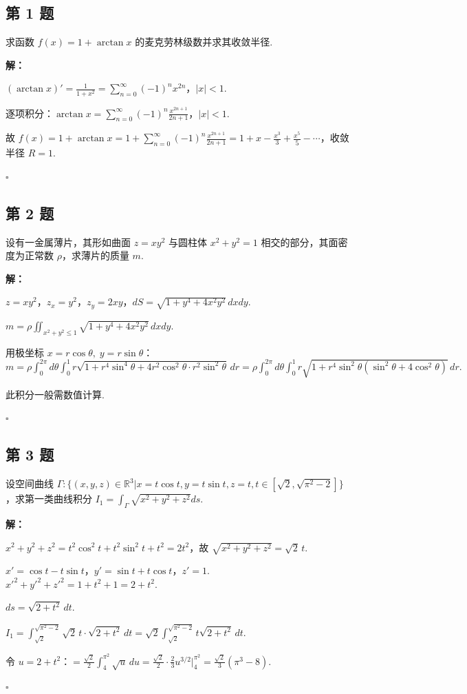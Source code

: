 \documentclass[12pt,a4paper]{article}
\newenvironment{sol}[1][解]{%
  \par\medskip\noindent\textbf{#1：}\itshape\par\noindent\ignorespaces
}{%
  \par\hfill$\square$\par\medskip
}
\begin{document}
\subsection*{第 1 题}
求函数 $f(x)=1+\arctan x$ 的麦克劳林级数并求其收敛半径.

\begin{sol}$(\arctan
  x)'=\frac{1}{1+x^2}=\sum_{n=0}^{\infty}(-1)^nx^{2n}$，$|x|<1$.

  逐项积分：$\arctan x=\sum_{n=0}^{\infty}(-1)^n\frac{x^{2n+1}}{2n+1}$，$|x|<1$.

  故 $f(x)=1+\arctan
  x=1+\sum_{n=0}^{\infty}(-1)^n\frac{x^{2n+1}}{2n+1}=1+x-\frac{x^3}{3}+\frac{x^5}{5}-\cdots$，收敛半径
  $R=1$.

\end{sol}
\subsection*{第 2 题}
设有一金属薄片，其形如曲面 $z=xy^2$ 与圆柱体 $x^2+y^2=1$ 相交的部分，其面密度为正常数 $\rho$，求薄片的质量 $m$.

\begin{sol}$z=xy^2$，$z_x=y^2$，$z_y=2xy$，$dS=\sqrt{1+y^4+4x^2y^2}\,dxdy$.

  $m=\rho\iint_{x^2+y^2\le 1}\sqrt{1+y^4+4x^2y^2}\,dxdy$.

  用极坐标 $x=r\cos\theta,\; y=r\sin\theta$：
  $m=\rho\int_0^{2\pi}d\theta\int_0^1
  r\sqrt{1+r^4\sin^4\theta+4r^2\cos^2\theta\cdot
  r^2\sin^2\theta}\,dr=\rho\int_0^{2\pi}d\theta\int_0^1
  r\sqrt{1+r^4\sin^2\theta(\sin^2\theta+4\cos^2\theta)}\,dr.$

  此积分一般需数值计算.

\end{sol}
\subsection*{第 3 题}
设空间曲线 $\Gamma: \{(x,y,z)\in\mathbb{R}^3|x=t\cos t, y=t\sin t, z=t,
t\in[\sqrt{2},\sqrt{\pi^2-2}]\}$，求第一类曲线积分
$I_1=\int_{\Gamma}\sqrt{x^2+y^2+z^2}ds$.

\begin{sol}$x^2+y^2+z^2=t^2\cos^2t+t^2\sin^2t+t^2=2t^2$，故
  $\sqrt{x^2+y^2+z^2}=\sqrt{2}\,t$.

  $x'=\cos t-t\sin t$，$y'=\sin t+t\cos t$，$z'=1$.
  $x'^2+y'^2+z'^2=1+t^2+1=2+t^2$.

  $ds=\sqrt{2+t^2}\,dt$.

  $I_1=\int_{\sqrt{2}}^{\sqrt{\pi^2-2}}\sqrt{2}\,t\cdot\sqrt{2+t^2}\,dt=\sqrt{2}\int_{\sqrt{2}}^{\sqrt{\pi^2-2}}t\sqrt{2+t^2}\,dt.$

  令
  $u=2+t^2$：$=\frac{\sqrt{2}}{2}\int_4^{\pi^2}\sqrt{u}\,du=\frac{\sqrt{2}}{2}\cdot\frac{2}{3}u^{3/2}\Big|_4^{\pi^2}=\frac{\sqrt{2}}{3}(\pi^3-8).$

\end{sol}
\end{document}
